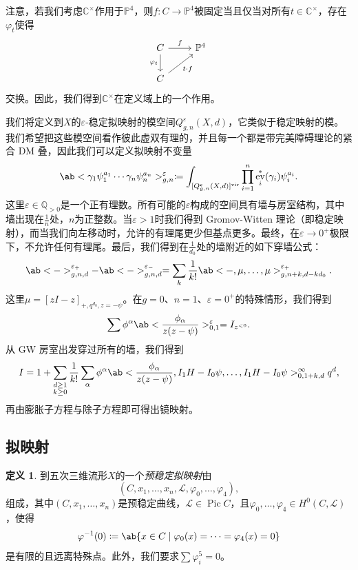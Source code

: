 \documentclass{amsart}
\theoremstyle{definition}
\newtheorem{defn}[thm]{定义}
\theoremstyle{remark}
\theoremstyle{plain}
\theoremstyle{definition}
\theoremstyle{remark}
\newcommand{\C}{\mathbb{C}}
\newcommand{\Q}{\mathbb{Q}}
\renewcommand{\P}{\mathbb{P}}
\newcommand{\ep}{\varepsilon}
\newcommand{\mc}[1]{\mathcal{#1}}
\newcommand{\mr}[1]{\mathrm{#1}}
\newcommand{\1}{\mathbf{1}}
\newcommand{\2}{\mathbf{2}}
\newcommand{\3}{\mathbf{3}}
\newcommand{\vir}{\mr{vir}}
\DeclareMathOperator{\Pic}{Pic}
\DeclareMathOperator{\ev}{ev}
\begin{document}
注意，若我们考虑\(\C^{\times}\)作用于\(\P^4\)，则\(f \colon C \to \P^4\)被固定当且仅当对所有\(t \in \C^{\times}\)，存在\(\varphi_t\)使得
\begin{equation*}
\begin{tikzcd}
    C \ar{r}{f} \ar{d}[swap]{\varphi_t} & \P^4 \\
    C \ar{ur}[swap]{t \cdot f}
\end{tikzcd}
\end{equation*}
交换。因此，我们得到\(\C^{\times}\)在定义域上的一个作用。

我们将定义到\(X\)的\(\ep\)-稳定拟映射的模空间\(Q_{g,n}^{\ep}(X, d)\)，它类似于稳定映射的模。我们希望把这些模空间看作彼此虚双有理的，并且每一个都是带完美障碍理论的紧合 DM 叠，因此我们可以定义拟映射不变量
\[ \ab< \gamma_1 \psi_1^{a_1} \cdots \gamma_n \psi_n^{a_n}>_{g,n}^{\ep} \coloneqq \int_{[Q_{g,n}^{\ep}(X,d)]^{\vir}} \prod_{i=1}^n \ev_i^*(\gamma_i) \psi_i^{a_i}. \]
这里\(\ep \in \Q_{>0}\)是一个正有理数。所有可能的\(\ep\)构成的空间具有墙与房室结构，其中墙出现在\(\frac{1}{n}\)处，\(n\)为正整数。当\(\ep > 1\)时我们得到 Gromov-Witten 理论（即稳定映射），而当我们向左移动时，允许的有理尾更少但基点更多。最终，在\(\ep \to 0^+\)极限下，不允许任何有理尾。最后，我们得到在\(\frac{1}{d_0}\)处的墙附近的如下穿墙公式：
\[ \ab<->_{g,n,d}^{\ep_+} - \ab<->_{g,n,d}^{\ep_-} = \sum_{k} \frac{1}{k!} \ab<-, \mu, \ldots, \mu>_{g,n+k, d-kd_0}^{\ep_+}. \]
这里\(\mu = [zI-z]_{+, q^{d_0}, z=-\psi}\)。在\(g = 0\)、\(n = 1\)、\(\ep = 0^+\)的特殊情形，我们得到
\[ \sum \phi^{\alpha} \ab<\frac{\phi_{\alpha}}{z(z-\psi)}>^{\ep}_{0,1} = I_{z^{<0}}. \]
从 GW 房室出发穿过所有的墙，我们得到
\[ I = 1 + \sum_{\substack{d \geq 1 \\ k \geq 0}} \frac{1}{k!} \sum_{\alpha} \phi^{\alpha} \ab< \frac{\phi_{\alpha}}{z(z-\psi)}, I_1 H - I_0 \psi, \ldots, I_1 H - I_0 \psi>_{0,1+k,d}^{\infty} q^d, \]
再由膨胀子方程与除子方程即可得出镜映射。

\subsection{拟映射}%
\label{sub:Quasimaps}

\begin{defn}
    到五次三维流形\(X\)的一个\textit{预稳定拟映射}由
    \[(C, x_1, \ldots, x_n, \mc{L}, \varphi_0, \ldots, \varphi_4),\]
    组成，其中\((C, x_1, \ldots, x_n)\)是预稳定曲线，\(\mc{L} \in \Pic C\)，且\(\varphi_0, \ldots, \varphi_4 \in H^0(C, \mc{L})\)，使得
    \[ \varphi^{-1}(0) \coloneqq \ab\{x \in C \mid \varphi_0(x) = \cdots = \varphi_4(x) = 0 \} \]
    是有限的且远离特殊点。此外，我们要求\(\sum \varphi_i^5 = 0\)。
\end{defn}
\end{document}
